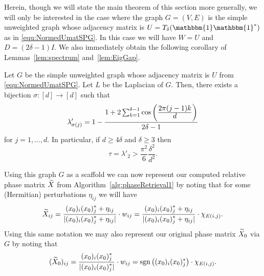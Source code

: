 Herein, though we will state the main theorem of this section more generally, we will only be interested in the case where the graph $G=(V,E)$ is the simple unweighted graph whose adjacency matrix is $U = T_{\delta}(\mathbbm{1} \mathbbm{1}^*)$ as in \eqref{equ:NormedUmatSPG}.  In this case we will have $W = U$ and $D = (2 \delta - 1)I$.  We also immediately obtain the following corollary of Lemmas~\ref{lem:spectrum} and~\ref{lem:EigGap}.

\begin{corollary}
Let $G$ be the simple unweighted graph whose adjacency matrix is $U$ from \eqref{equ:NormedUmatSPG}.  Let $L$ be the Laplacian of $G$.  Then, there exists a bijection $\sigma:[d] \rightarrow [d]$ such that
$$\lambda'_{\sigma(j)} = 1 - \frac{1 + 2 \sum_{k = 1}^{\delta - 1}\cos\left(\frac{\displaystyle 2\pi (j-1) k}{\displaystyle d}\right)}{2 \delta - 1}$$
for $j = 1, \dots, d$.  In particular, if $d \geq 4 \delta$ and $\delta \geq 3$ then \[\tau = \lambda'_2 > \dfrac{\pi^2}{6} \dfrac{\delta^2}{d^2}.\]
\label{cor:Gspectrum}
\end{corollary}

Using this graph $G$ as a scaffold we can now represent our computed relative phase matrix $\widetilde{X}$ from Algorithm~\ref{alg:phaseRetrieval1} by noting that for some (Hermitian) perturbations $\eta_{ij}$ 
we will have 
\begin{equation}
\widetilde{X}_{ij} = \frac{\displaystyle (x_0)_i(x_0)_j^* + \eta_{ij}}{\displaystyle |(x_0)_i(x_0)_j^* + \eta_{ij}|} \cdot w_{ij} = \frac{\displaystyle (x_0)_i(x_0)_j^* + \eta_{ij}}{\displaystyle |(x_0)_i(x_0)_j^* + \eta_{ij}|} \cdot \chi_{E(i, j)}.
\label{equ:DeftildeXviaGcomp}
\end{equation}
 Using this same notation we may also represent our original phase matrix $\widetilde{X}_0$ %
via $G$ by noting that
\begin{equation}
(\widetilde{X}_0)_{ij} = \frac{\displaystyle (x_0)_i(x_0)_j^*}{\displaystyle |(x_0)_i(x_0)_j^*|} \cdot w_{ij} = \mathrm{sgn} \left( (x_0)_i(x_0)_j^* \right) \cdot \chi_{E(i, j)}.
\label{equ:DeftildeXviaGpure}
\end{equation}

